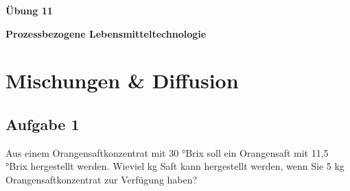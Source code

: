 \documentclass[a4paper,11pt]{article}
\newif\ifshowme
\begin{document}


\bckgrnd


\begin{center}
\LARGE
\color{white}
\textbf{Übung 11} \par \vspace*{2mm}
\large \color{miugray} \textbf{Prozessbezogene Lebensmitteltechnologie}
\end{center}
\par 
\vspace*{6mm}


\color{miudiutex}
\section*{Mischungen \& Diffusion}

\subsection*{Aufgabe 1}
Aus einem Orangensaftkonzentrat mit 30 °Brix soll ein Orangensaft mit 11,5 °Brix hergestellt
werden. Wieviel kg Saft kann hergestellt werden, wenn Sie 5 kg Orangensaftkonzentrat zur
Verfügung haben?



\ifshowme
\antwort{
$m_1 = 5~\text{kg};~m_2 = m_1 + m_3 ;~m_3 = ~?~;~x_1=30~\text{°};~x_2=11,5~\text{°};~x_3=0~\text{°}$
\begin{align*}
m_1 \cdot x_1 + m_3 \cdot x_3 &= m_2 \cdot x_2 \\
m_1 \cdot x_1 + m_3 \cdot x_3 &= m_1 \cdot x_2 + m_3 \cdot x_2 \\
m_1 \cdot x_1 + m_3 \cdot x_3 - m_1 \cdot x_2 &= m_3 \cdot x_2 \\
m_1 \cdot x_1 - m_1 \cdot x_2 &= m_3 \cdot x_2 - m_3 \cdot x_3\\
m_1 \cdot x_1 - m_1 \cdot x_2 &= m_3 \cdot (x_2 - x_3)\\
\frac{m_1 \cdot x_1 - m_1 \cdot x_2}{x_2 - x_3} &= m_3 = 8,04
\end{align*}
Wir können also zu unseren vorhandenen 5 kg Orangensaftkonzentrat weitere 8,04 kg Wasser hinzugeben um einen °Brix von 11,5 zu erreichen. Dementsprechend erhalten wir 13,04 kg Orangensaft.

}
\pagebreak
\else
\fi
\end{document}
